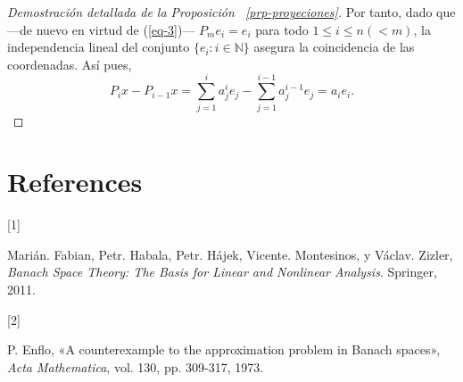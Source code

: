 \documentclass[
  spanish,
  letterpaper,
  DIV=11,
  numbers=noendperiod]{scrreprt}
\newlength{\cslhangindent}
\newlength{\csllabelwidth}
\newenvironment{CSLReferences}[2] %
 {\begin{list}{}{%
  \setlength{\itemindent}{0pt}
  \setlength{\leftmargin}{0pt}
  \setlength{\parsep}{0pt}
  \ifodd #1
   \setlength{\leftmargin}{\cslhangindent}
   \setlength{\itemindent}{-1\cslhangindent}
  \fi
  \setlength{\itemsep}{#2\baselineskip}}}
 {\end{list}}
\newcommand{\CSLLeftMargin}[1]{\parbox[t]{\csllabelwidth}{\strut#1\strut}}
\newcommand{\CSLRightInline}[1]{\parbox[t]{\linewidth - \csllabelwidth}{\strut#1\strut}}
\theoremstyle{definition}
\theoremstyle{remark}
\theoremstyle{definition}
\theoremstyle{exampstyle}
\theoremstyle{plain}
\theoremstyle{plain}
\theoremstyle{definition}
\theoremstyle{plain}
\theoremstyle{remark}
\begin{document}
\begin{proof}[Demostración detallada de la Proposición
~\ref{prp-proyeciones}]
Por tanto, dado que ---de nuevo en virtud de (\ref{eq-3})---
\(P_me_i=e_i\) para todo \(1\leq i\leq n(<m)\), la independencia lineal
del conjunto \(\{e_i\colon i\in\mathbb{N}\}\) asegura la coincidencia de
las coordenadas. Así pues, \[
P_ix-P_{i-1}x=\sum_{j=1}^i a^i_je_j-\sum_{j=1}^{i-1}a^{i-1}_je_j=a_ie_i.
\]

\end{proof}


\chapter*{References}\label{references}


\protect{}\label{refs}
\begin{CSLReferences}{0}{0}
\CSLLeftMargin{{[}1{]} }%
\CSLRightInline{Marián. Fabian, Petr. Habala, Petr. Hájek, Vicente.
Montesinos, y Václav. Zizler, \emph{Banach Space Theory: The Basis for
Linear and Nonlinear Analysis}. Springer, 2011.}

\CSLLeftMargin{{[}2{]} }%
\CSLRightInline{P. Enflo, {«A counterexample to the approximation
problem in {Banach} spaces»}, \emph{Acta Mathematica}, vol. 130, pp.
309-317, 1973.}

\end{CSLReferences}
\end{document}

